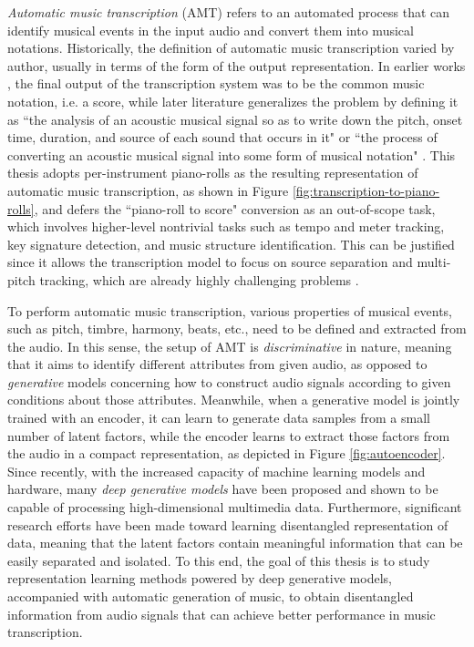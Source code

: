 \emph{Automatic music transcription} (AMT) refers to an automated process that can identify musical events in the input audio and convert them into musical notations.
Historically, the definition of automatic music transcription varied by author, usually in terms of the form of the output representation.
In earlier works \cite{moorer1977transcription,piszczalski1977transcription}, the final output of the transcription system was to be the common music notation, i.e. a score, while later literature generalizes the problem by defining it as ``the analysis of an acoustic musical signal so as to write down the pitch, onset time, duration, and source of each sound that occurs in it" \cite{klapuri2006transcription} or ``the process of converting an acoustic musical signal into some form of musical notation" \cite{benetos2013transcription}.
This thesis adopts per-instrument piano-rolls as the resulting representation of automatic music transcription, as shown in Figure \ref{fig:transcription-to-piano-rolls}, and defers the ``piano-roll to score" conversion as an out-of-scope task, which involves higher-level nontrivial tasks such as tempo and meter tracking, key signature detection, and music structure identification.
This can be justified since it allows the transcription model to focus on source separation and multi-pitch tracking, which are already highly challenging problems \cite{cemgil2006generative}.


To perform automatic music transcription, various properties of musical events, such as pitch, timbre, harmony, beats, etc., need to be defined and extracted from the audio.
In this sense, the setup of AMT is \emph{discriminative} in nature, meaning that it aims to identify different attributes from given audio, as opposed to \emph{generative} models concerning how to construct audio signals according to given conditions about those attributes.
Meanwhile, when a generative model is jointly trained with an encoder, it can learn to generate data samples from a small number of latent factors, while the encoder learns to extract those factors from the audio in a compact representation, as depicted in Figure \ref{fig:autoencoder}.
Since recently, with the increased capacity of machine learning models and hardware, many \emph{deep generative models} have been proposed and shown to be capable of processing high-dimensional multimedia data.
Furthermore, significant research efforts have been made toward learning disentangled representation of data, meaning that the latent factors contain meaningful information that can be easily separated and isolated.
To this end, the goal of this thesis is to study representation learning methods powered by deep generative models, accompanied with automatic generation of music, to obtain disentangled information from audio signals that can achieve better performance in music transcription.

